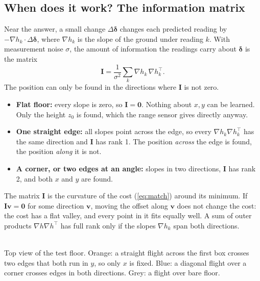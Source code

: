 \documentclass[11pt,a4paper]{article}
\newcommand{\vect}[1]{\mathbf{#1}}
\begin{document}
\subsection{When does it work? The information matrix}
Near the answer, a small change $\Delta\vect{\delta}$ changes each predicted reading by $-\nabla h_k\cdot
\Delta\vect{\delta}$, where $\nabla h_k$ is the slope of the ground under reading $k$. With measurement noise
$\sigma$, the amount of information the readings carry about $\vect{\delta}$ is the matrix
\begin{equation}
\vect{I}=\frac{1}{\sigma^2}\sum_k\nabla h_k\,\nabla h_k^{\!\top}.
\end{equation}
The position can only be found in the directions where $\vect{I}$ is not zero.
\begin{itemize}[leftmargin=*]
\item \textbf{Flat floor:} every slope is zero, so $\vect{I}=\vect{0}$. Nothing about $x,y$ can be learned. Only
the height $z_0$ is found, which the range sensor gives directly anyway.
\item \textbf{One straight edge:} all slopes point across the edge, so every $\nabla h_k\nabla h_k^{\!\top}$ has the
same direction and $\vect{I}$ has rank 1. The position \emph{across} the edge is found, the position \emph{along} it
is not.
\item \textbf{A corner, or two edges at an angle:} slopes in two directions, $\vect{I}$ has rank 2, and both $x$ and
$y$ are found.
\end{itemize}
\begin{whybox}
The matrix $\vect{I}$ is the curvature of the cost (\ref{eq:match}) around its minimum. If $\vect{I}\vect{v}=\vect{0}$
for some direction $\vect{v}$, moving the offset along $\vect{v}$ does not change the cost: the cost has a flat
valley, and every point in it fits equally well. A sum of outer products $\nabla h\nabla h^{\!\top}$ has full rank
only if the slopes $\nabla h_k$ span both directions.
\end{whybox}

\begin{center}
\\
\small Top view of the test floor. Orange: a straight flight across the first box crosses two edges that both run
in $y$, so only $x$ is fixed. Blue: a diagonal flight over a corner crosses edges in both directions. Grey: a flight
over bare floor.
\end{center}
\end{document}
